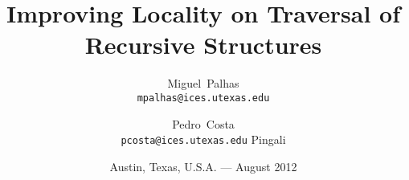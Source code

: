 

\titlehead{University of Texas%
\\%
\hfill Institute for Computational Engineering and Sciences%
\hfill Center for Distributed and Grid Computing}

\title{Improving Locality on Traversal of Recursive Structures}


\author{Miguel~Palhas\\\texttt{\smaller mpalhas@ices.utexas.edu}%
\and Pedro~Costa\\\texttt{\smaller pcosta@ices.utexas.edu}%
Pingali
}

\date{Austin, Texas, U.S.A. --- August 2012}

\subject{Summer Internship}